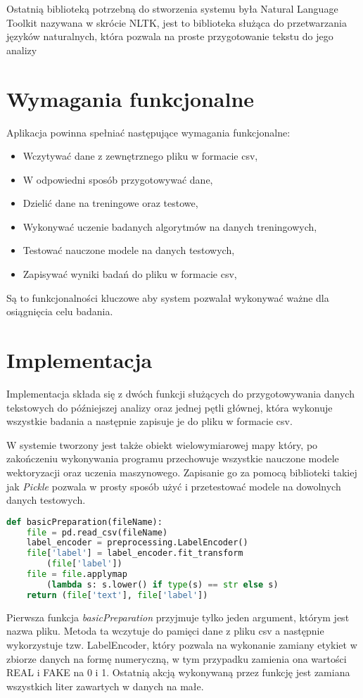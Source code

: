 Ostatnią biblioteką potrzebną do stworzenia systemu była Natural Language Toolkit nazywana w skrócie 
NLTK, jest to biblioteka służąca do przetwarzania języków naturalnych, która pozwala na proste przygotowanie tekstu do jego analizy
\section{Wymagania funkcjonalne}
Aplikacja powinna spełniać następujące wymagania funkcjonalne: 
\begin{itemize}
    \item Wczytywać dane z zewnętrznego pliku w formacie csv,
    \item W odpowiedni sposób przygotowywać dane,
    \item Dzielić dane na treningowe oraz testowe,
    \item Wykonywać uczenie badanych algorytmów na danych treningowych,
    \item Testować nauczone modele na danych testowych,
    \item Zapisywać wyniki badań do pliku w formacie csv,
\end{itemize}
Są to funkcjonalności kluczowe aby system pozwalał wykonywać ważne dla osiągnięcia celu
badania. 
\section{Implementacja}
Implementacja składa się z dwóch funkcji służących do przygotowywania danych tekstowych
do późniejszej analizy oraz jednej pętli głównej, która wykonuje wszystkie badania
a następnie zapisuje je do pliku w formacie csv. 

W systemie tworzony jest także obiekt
wielowymiarowej mapy który, po zakończeniu wykonywania programu przechowuje
wszystkie nauczone modele wektoryzacji oraz uczenia maszynowego. Zapisanie go za pomocą
biblioteki takiej jak \textit{Pickle} pozwala
w prosty sposób użyć i przetestować modele na dowolnych danych testowych. 


\begin{lstlisting}[language=Python, caption={Funkcja przygotowywująca dane pobrane z pliku csv}, captionpos=b, frame=single]
def basicPreparation(fileName): 
    file = pd.read_csv(fileName)
    label_encoder = preprocessing.LabelEncoder()
    file['label'] = label_encoder.fit_transform
        (file['label']) 
    file = file.applymap
        (lambda s: s.lower() if type(s) == str else s) 
    return (file['text'], file['label'])
\end{lstlisting}
Pierwsza funkcja \textit{basicPreparation} przyjmuje tylko jeden argument, którym jest
nazwa pliku. Metoda ta wczytuje do pamięci dane z pliku csv a następnie wykorzystuje
tzw. LabelEncoder, który pozwala na wykonanie zamiany etykiet w zbiorze danych na formę
numeryczną, w tym przypadku zamienia ona wartości REAL i FAKE na 0 i 1. Ostatnią 
akcją wykonywaną przez funkcję jest zamiana wszystkich liter zawartych w danych na małe.

